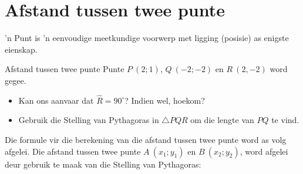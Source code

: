 \section{Afstand tussen twee punte}
'n Punt is 'n eenvoudige meetkundige voorwerp met ligging (posisie) as enigste eienskap. 


\begin{Investigation}{Afstand tussen twee punte}
Punte $P~(2;1)$, $Q~(-2;-2)$ en $R~(2,-2)$ word gegee. 
\begin{itemize}
 \item Kan ons aanvaar dat $\hat{R}=90^{\circ}$? Indien wel, hoekom?
\item Gebruik die Stelling van Pythagoras in $\triangle PQR$ om die lengte van $PQ$ te vind.
\end{itemize}

\setcounter{subfigure}{0}
\begin{figure}[H] %
\begin{center}
\end{center}
\label{fig:trianglePQR}
\end{figure} 
\end{Investigation}       
%       
Die formule vir die berekening van die afstand tussen twee punte word as volg afgelei. Die afstand tussen twee
punte $A~({x}_{1};{y}_{1})$ en $B~({x}_{2};{y}_{2})$, word afgelei deur gebruik te maak van die Stelling van Pythagoras:\par 

